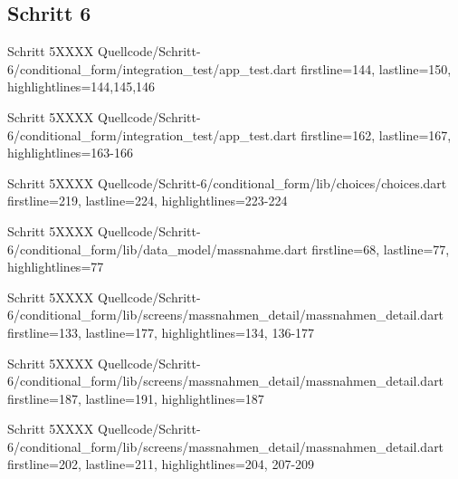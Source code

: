 \ifincludeall \clearpage \fi 


\subsection{Schritt 6}

\begin{alexlisting}{Schritt 5}{XXXX}
    {Quellcode/Schritt-6/conditional_form/integration_test/app_test.dart}
    {firstline=144, lastline=150, highlightlines={144,145,146}}
    \label{lst:Schritt6XXXX}
  \end{alexlisting}

  
\begin{alexlisting}{Schritt 5}{XXXX}
    {Quellcode/Schritt-6/conditional_form/integration_test/app_test.dart}
    {firstline=162, lastline=167, highlightlines={163-166}}
    \label{lst:Schritt6XXXX}
  \end{alexlisting}

  \begin{alexlisting}{Schritt 5}{XXXX}
    {Quellcode/Schritt-6/conditional_form/lib/choices/choices.dart}
    {firstline=219, lastline=224, highlightlines={223-224}}
    \label{lst:Schritt6XXXX}
  \end{alexlisting}

  \begin{alexlisting}{Schritt 5}{XXXX}
    {Quellcode/Schritt-6/conditional_form/lib/data_model/massnahme.dart}
    {firstline=68, lastline=77, highlightlines={77}}
    \label{lst:Schritt6XXXX}
  \end{alexlisting}

  \begin{alexlisting}{Schritt 5}{XXXX}
    {Quellcode/Schritt-6/conditional_form/lib/screens/massnahmen_detail/massnahmen_detail.dart}
    {firstline=133, lastline=177, highlightlines={134, 136-177}}
    \label{lst:Schritt6XXXXX}
  \end{alexlisting}

  \begin{alexlisting}{Schritt 5}{XXXX}
    {Quellcode/Schritt-6/conditional_form/lib/screens/massnahmen_detail/massnahmen_detail.dart}
    {firstline=187, lastline=191, highlightlines={187}}
    \label{lst:Schritt6XXXXX}
  \end{alexlisting}

  \begin{alexlisting}{Schritt 5}{XXXX}
    {Quellcode/Schritt-6/conditional_form/lib/screens/massnahmen_detail/massnahmen_detail.dart}
    {firstline=202, lastline=211, highlightlines={204, 207-209}}
    \label{lst:Schritt6XXXXX}
  \end{alexlisting}


